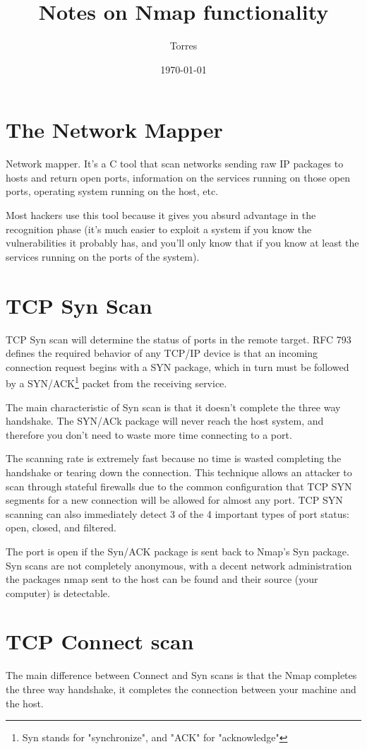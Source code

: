 \documentclass{article}
\title{Notes on Nmap functionality}
\author{Torres}
\date{\today}
\begin{document}
\maketitle
\section{The Network Mapper}

Network mapper. It's a C tool that scan networks sending
raw IP packages to hosts and return open ports, information
on the services running on those open ports, operating
system running on the host, etc.

Most hackers use this tool because it gives you absurd
advantage in the recognition phase (it's much easier to
exploit a system if you know the vulnerabilities it probably
has, and you'll only know that if you know at least the
services running on the ports of the system).

\section{TCP Syn Scan}

TCP Syn scan will determine the status of ports in the remote
target. RFC 793 defines the required behavior of any TCP/IP device
is that an incoming connection request begins with a SYN package,
which in turn must be followed by a SYN/ACK\footnote{Syn stands
for "synchronize", and "ACK" for "acknowledge"} packet from
the receiving service.

The main characteristic of Syn scan is that it doesn't complete
the three way handshake. The SYN/ACk package will never reach the
host system, and therefore you don't need to waste more time
connecting to a port.

The scanning rate is extremely fast because no time is wasted
completing the handshake or tearing down the connection. This
technique allows an attacker to scan through stateful firewalls
due to the common configuration that TCP SYN segments for a new
connection will be allowed for almost any port. TCP SYN scanning
can also immediately detect 3 of the 4 important types of port
status: open, closed, and filtered.

The port is open if the Syn/ACK package is sent back to Nmap's
Syn package. Syn scans are not completely anonymous, with a
decent network administration the packages nmap sent to the host
can be found and their source (your computer) is detectable.

\section{TCP Connect scan}

The main difference between Connect and Syn scans is that the
Nmap completes the three way handshake, it completes the connection
between your machine and the host.
\end{document}
